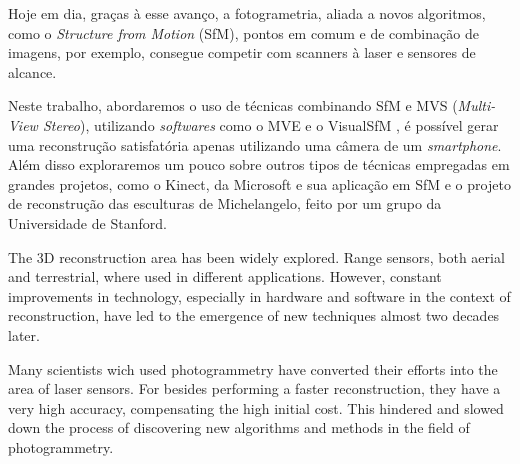 \documentclass[a4paper,12pt,oneside,onecolumn,final,fleqn]{repUERJ}
\theoremstyle{plain}
\theoremstyle{definition}
\begin{document}
Hoje em dia, graças à esse avanço, a fotogrametria, aliada a novos algoritmos, como o \emph{Structure from Motion} (SfM), pontos em comum e de combinação de imagens, por exemplo, consegue competir com scanners à laser e sensores de alcance. 

Neste trabalho, abordaremos o uso de técnicas combinando SfM e MVS (\emph{Multi-View Stereo}), utilizando \emph{softwares} como o MVE \cite{mve} e o VisualSfM \cite{wu2011visualsfm}, é possível gerar uma reconstrução satisfatória apenas utilizando uma câmera de um \emph{smartphone}. Além disso exploraremos um pouco sobre outros tipos de técnicas empregadas em grandes projetos, como o Kinect, da Microsoft e sua aplicação em SfM e o projeto de reconstrução das esculturas de Michelangelo, feito por um grupo da Universidade de Stanford.





\imprimirchaves




The 3D reconstruction area has been widely explored. Range sensors, both aerial and terrestrial, where used in different applications. However, constant improvements in technology, especially in hardware and software in the context of reconstruction, have led to the emergence of new techniques almost two decades later.

Many scientists wich used photogrammetry have converted their efforts into the area of laser sensors. For besides performing a faster reconstruction, they have a very high accuracy, compensating the high initial cost. This hindered and slowed down the process of discovering new algorithms and methods in the field of photogrammetry.
\end{document}
